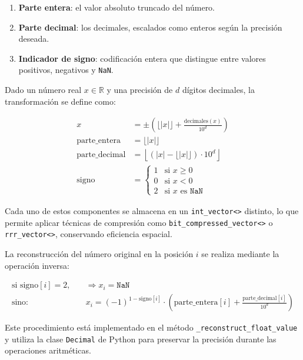 \begin{enumerate}
    \item \textbf{Parte entera}: el valor absoluto truncado del número.
    \item \textbf{Parte decimal}: los decimales, escalados como enteros según la precisión deseada.
    \item \textbf{Indicador de signo}: codificación entera que distingue entre valores positivos, negativos y \texttt{NaN}.
\end{enumerate}

Dado un número real $x \in \mathbb{R}$ y una precisión de $d$ dígitos decimales, la transformación se define como:

\begin{align*}
    x &= \pm \left( \lfloor |x| \rfloor + \frac{\mathrm{decimales}(x)}{10^d} \right) \\
    \text{parte\_entera} &= \lfloor |x| \rfloor \\
    \text{parte\_decimal} &= \left\lfloor (|x| - \lfloor |x| \rfloor) \cdot 10^d \right\rfloor \\
    \text{signo} &=
        \begin{cases}
            1 & \text{si } x \geq 0 \\
            0 & \text{si } x < 0 \\
            2 & \text{si } x \text{ es } \texttt{NaN}
        \end{cases}
\end{align*}

Cada uno de estos componentes se almacena en un \texttt{int\_vector<>} distinto, lo que permite aplicar técnicas de compresión como \texttt{bit\_compressed\_vector<>} o \texttt{rrr\_vector<>}, conservando eficiencia espacial.

\vspace{1em}
\noindent
La reconstrucción del número original en la posición $i$ se realiza mediante la operación inversa:

\begin{align*}
    \text{si } \text{signo}[i] = 2, \quad &\Rightarrow x_i = \texttt{NaN} \\
    \text{sino: } \quad &x_i = (-1)^{1 - \text{signo}[i]} \cdot \left( \text{parte\_entera}[i] + \frac{\text{parte\_decimal}[i]}{10^d} \right)
\end{align*}

\noindent
Este procedimiento está implementado en el método \texttt{\_reconstruct\_float\_value} y utiliza la clase \texttt{Decimal} de Python para preservar la precisión durante las operaciones aritméticas.

